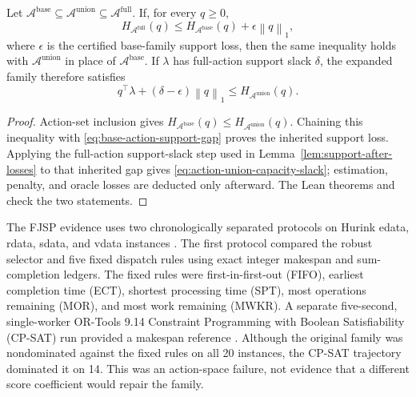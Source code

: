 \documentclass[opre,dblanonrev]{informs4}
\newcommand{\Afull}{\mathcal A^{\mathrm{full}}}
\newcommand{\normone}[1]{\left\|#1\right\|_1}
\begin{document}
\begin{proposition}
\label{prop:action-union-monotonicity}
Let \(\mathcal A^{\mathrm{base}}\subseteq
\mathcal A^{\mathrm{union}}\subseteq\Afull\).  If, for every \(q\geq 0\),
\begin{equation}
  H_{\Afull}(q)
  \leq H_{\mathcal A^{\mathrm{base}}}(q)
    +\epsilon\normone{q},
  \label{eq:base-action-support-gap}
\end{equation}
where \(\epsilon\) is the certified base-family support loss,
then the same inequality holds with
\(\mathcal A^{\mathrm{union}}\) in place of
\(\mathcal A^{\mathrm{base}}\).  If \(\lambda\) has full-action support slack
\(\delta\), the expanded family therefore satisfies
\begin{equation}
  q^\top\lambda+(\delta-\epsilon)\normone{q}
  \leq H_{\mathcal A^{\mathrm{union}}}(q).
  \label{eq:action-union-capacity-slack}
\end{equation}
\end{proposition}

\begin{proof}
Action-set inclusion gives
\(H_{\mathcal A^{\mathrm{base}}}(q)\leq
H_{\mathcal A^{\mathrm{union}}}(q)\).  Chaining this inequality with
\eqref{eq:base-action-support-gap} proves the inherited support loss.  Applying
the full-action support-slack step used in
Lemma~\ref{lem:support-after-losses} to that inherited gap gives
\eqref{eq:action-union-capacity-slack}; estimation, penalty, and oracle losses
are deducted only afterward.  The Lean theorems
 and
 check the two
statements.
\end{proof}

The FJSP evidence uses two chronologically separated protocols on Hurink edata,
rdata, sdata, and vdata instances \citep{hurink1994tabu}.  The first protocol
compared the robust selector and five fixed dispatch rules using exact integer
makespan and sum-completion ledgers.  The fixed rules were first-in-first-out
(FIFO), earliest completion time (ECT), shortest processing time (SPT), most
operations remaining (MOR), and most work remaining (MWKR).  A separate
five-second, single-worker OR-Tools 9.14 Constraint Programming with Boolean
Satisfiability (CP-SAT) run provided a makespan reference
\citep{perron2023cpsat}.  Although the original family was nondominated against
the fixed rules on all 20 instances, the CP-SAT trajectory dominated it on 14.
This was an action-space failure, not evidence that a different score
coefficient would repair the family.
\end{document}
